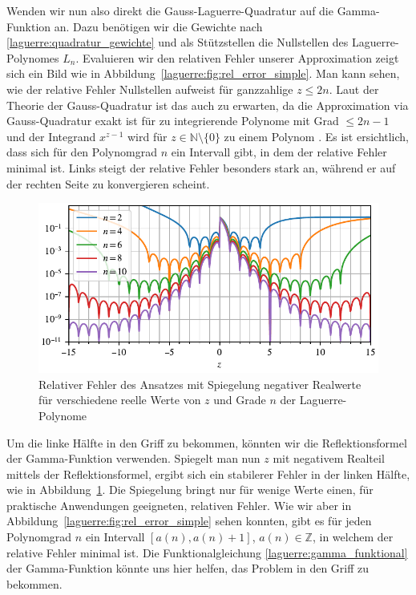 Wenden wir nun also direkt die Gauss-Laguerre-Quadratur
auf die Gamma-Funktion an.
Dazu benötigen wir die Gewichte nach
\eqref{laguerre:quadratur_gewichte}
und als Stützstellen die Nullstellen des Laguerre-Polynomes $L_n$.
Evaluieren wir den relativen Fehler unserer Approximation zeigt sich ein
Bild wie in Abbildung~\ref{laguerre:fig:rel_error_simple}.
Man kann sehen,
wie der relative Fehler Nullstellen aufweist für ganzzahlige $z \leq 2n$.
Laut der Theorie der Gauss-Quadratur ist das auch zu erwarten,
da die Approximation via Gauss-Quadratur
exakt ist für zu integrierende Polynome mit Grad $\leq 2n-1$ und
der Integrand $x^{z-1}$ wird für $z \in \mathbb{N} \setminus \{0\}$
zu einem Polynom .
Es ist ersichtlich,
dass sich für den Polynomgrad $n$ ein Intervall gibt,
in dem der relative Fehler minimal ist.
Links steigt der relative Fehler besonders stark an,
während er auf der rechten Seite zu konvergieren scheint.

\begin{figure}
\centering
% 
\includegraphics{papers/laguerre/images/rel_error_mirror.pdf}
\caption{Relativer Fehler des Ansatzes mit Spiegelung negativer Realwerte
für verschiedene reelle Werte von $z$ und Grade $n$ der Laguerre-Polynome}
\label{laguerre:fig:rel_error_mirror}
\end{figure}

Um die linke Hälfte in den Griff zu bekommen,
könnten wir die Reflektionsformel der Gamma-Funktion verwenden.
Spiegelt man nun $z$ mit negativem Realteil mittels der Reflektionsformel,
ergibt sich ein stabilerer Fehler in der linken Hälfte,
wie in Abbildung~\ref{laguerre:fig:rel_error_mirror}.
Die Spiegelung bringt nur für wenige Werte einen,
für praktische Anwendungen geeigneten,
relativen Fehler.
Wie wir aber in Abbildung~\ref{laguerre:fig:rel_error_simple} sehen konnten,
gibt es für jeden Polynomgrad $n$ ein Intervall $[a(n), a(n) + 1]$,
$a(n) \in \mathbb{Z}$,
in welchem der relative Fehler minimal ist.
Die Funktionalgleichung
\eqref{laguerre:gamma_funktional}
der Gamma-Funktion
könnte uns hier helfen,
das Problem in den Griff zu bekommen.

